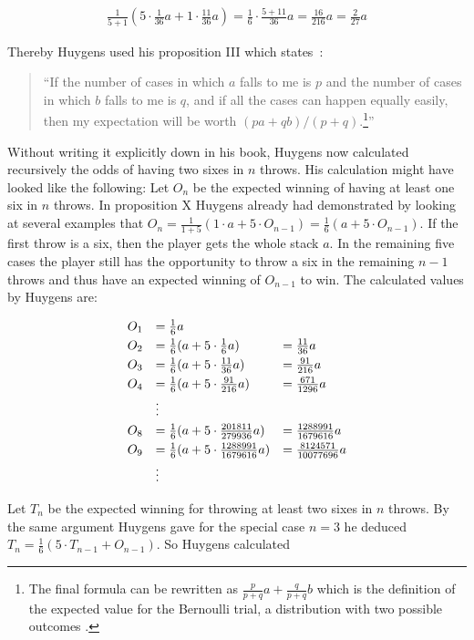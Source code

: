 \begin{align}
  \frac{1}{5+1} \left(5 \cdot \frac 1{36} a + 1 \cdot \frac{11}{36} a \right) = \frac{1}{6} \cdot \frac{5+11}{36} a = \frac{16}{216} a = \frac{2}{27} a
\end{align}

\noindent Thereby Huygens used his proposition III which states~\cite[p. 135]{bernoulli}:

\begin{quote}
  ``If the number of cases in which $a$ falls to me is $p$ and the number of cases in which $b$ falls to me is $q$, and if all the cases can happen equally easily, then my expectation will be worth $(pa+qb)/(p+q)$.\footnote{The final formula can be rewritten as $\tfrac{p}{p+q} a+\tfrac q{p+q} b$ which is the definition of the expected value for the Bernoulli trial, a distribution with two possible outcomes \cite{wiki:bernoulli_distribution}.}''
\end{quote}

Without writing it explicitly down in his book, Huygens now calculated recursively the odds of having two sixes in $n$ throws. His calculation might have looked like the following: Let $O_n$ be the expected winning of having at least one six in $n$ throws. In proposition X Huygens already had demonstrated by looking at several examples that $O_n = \tfrac 1{1+5} \left( 1 \cdot a + 5 \cdot O_{n-1} \right)=\tfrac 16 \left( a + 5 \cdot O_{n-1} \right)$. If the first throw is a six, then the player gets the whole stack $a$. In the remaining five cases the player still has the opportunity to throw a six in the remaining $n-1$ throws and thus have an expected winning of $O_{n-1}$ to win. The calculated values by Huygens are:

\begin{align}
  \begin{array}{rll}
    O_1 & = \frac 16 a \nl
    O_2 & = \frac 16 ( a + 5 \cdot \frac 16 a) & = \frac{11}{36} a \nl
    O_3 & = \frac 16 ( a + 5 \cdot \frac{11}{36} a) & = \frac{91}{216} a \nl
    O_4 & = \frac 16 ( a + 5 \cdot \frac{91}{216} a) & = \frac{671}{1296} a \nl
    & \vdots \nl
    O_8 & = \frac 16 ( a + 5 \cdot \frac{201811}{279936} a) & = \frac{1288991}{1679616} a \nl
    O_9 & = \frac 16 ( a + 5 \cdot \frac{1288991}{1679616} a) & = \frac{8124571}{10077696} a \nl
    & \vdots
  \end{array}
\end{align}

Let $T_n$ be the expected winning for throwing at least two sixes in $n$ throws. By the same argument Huygens gave for the special case $n=3$ he deduced $T_n = \tfrac{1}{6} ( 5 \cdot T_{n-1}  + O_{n-1})$. So Huygens calculated

